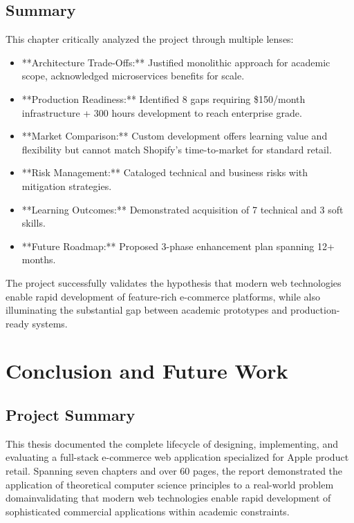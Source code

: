 \documentclass[12pt, a4paper]{report}
\begin{document}
\section{Summary}

This chapter critically analyzed the project through multiple lenses:

\begin{itemize}
    \item **Architecture Trade-Offs:** Justified monolithic approach for academic scope, acknowledged microservices benefits for scale.
    \item **Production Readiness:** Identified 8 gaps requiring \$150/month infrastructure + 300 hours development to reach enterprise grade.
    \item **Market Comparison:** Custom development offers learning value and flexibility but cannot match Shopify's time-to-market for standard retail.
    \item **Risk Management:** Cataloged technical and business risks with mitigation strategies.
    \item **Learning Outcomes:** Demonstrated acquisition of 7 technical and 3 soft skills.
    \item **Future Roadmap:** Proposed 3-phase enhancement plan spanning 12+ months.
\end{itemize}

The project successfully validates the hypothesis that modern web technologies enable rapid development of feature-rich e-commerce platforms, while also illuminating the substantial gap between academic prototypes and production-ready systems.


\chapter{Conclusion and Future Work}

\section{Project Summary}

This thesis documented the complete lifecycle of designing, implementing, and evaluating a full-stack e-commerce web application specialized for Apple product retail. Spanning seven chapters and over 60 pages, the report demonstrated the application of theoretical computer science principles to a real-world problem domainvalidating that modern web technologies enable rapid development of sophisticated commercial applications within academic constraints.
\end{document}
